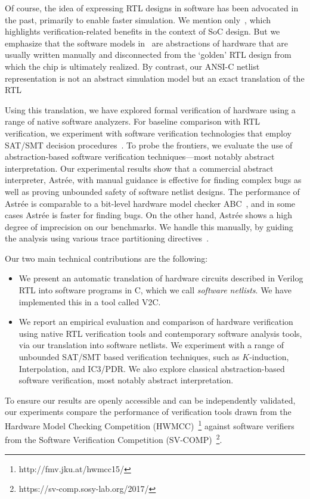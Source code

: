 Of course, the idea of expressing RTL designs in software has been  advocated in the past, primarily to enable faster simulation. We mention only~\cite{soc-keating}, which highlights verification-related benefits in the context of SoC design.  But we emphasize that the software models in~\cite{soc-keating} are abstractions of hardware that are usually written manually and disconnected from the `golden' RTL design  from which the chip is ultimately realized.  By contrast, our ANSI-C netlist representation is not an abstract simulation model but an exact translation of the RTL

Using this translation, we have explored formal verification of hardware using a range of 
native software analyzers.  For baseline comparison with RTL verification, we experiment with software verification technologies that employ SAT/SMT decision procedures~\cite{DBLP:conf/cav/BeyerK11,2ls,cbmc.tacas:2004,DBLP:conf/tacas/HeizmannDGLMSP16}. To 
probe the frontiers, we evaluate the use of abstraction-based software verification 
techniques---most notably abstract interpretation. Our experimental results show that a commercial abstract interpreter,  Astr{\'e}e, with manual guidance is effective for finding complex bugs 
as well as proving unbounded safety of software netlist designs. The performance of Astr{\'e}e is 
comparable to a bit-level hardware model checker ABC~\cite{abc}, and in some cases Astr{\'e}e is faster for finding bugs.  On the other hand, 
Astr{\'e}e shows a high degree of imprecision on our benchmarks. We handle this 
manually, by guiding the analysis using various trace 
partitioning directives~\cite{DBLP:journals/toplas/RivalM07}.  

Our two main technical contributions are the following:
%
\begin{itemize}
\item We present an automatic translation of hardware circuits described in Verilog RTL into software 
programs in C, which we call \textit{software netlists}.  We have implemented this in a tool called V2C.  

\item We report an empirical evaluation and comparison of hardware verification using native RTL verification tools and contemporary software analysis tools, via our translation into software netlists. 
We experiment with a range of unbounded SAT/SMT based verification techniques, 
such as $K$-induction, Interpolation, and IC3/PDR. We also explore classical abstraction-based 
software verification, most notably abstract interpretation.
\end{itemize}

\noindent To ensure our results are openly accessible and can be independently validated, our experiments compare the performance of verification tools drawn from  the Hardware Model Checking Competition (HWMCC)~\footnote{http://fmv.jku.at/hwmcc15/} against software verifiers from the Software Verification Competition (SV-COMP)~\footnote{https://sv-comp.sosy-lab.org/2017/}.
